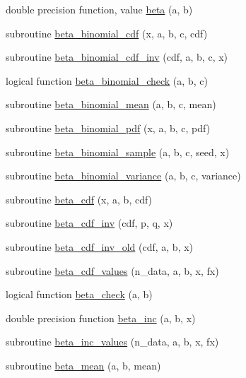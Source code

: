 \begin{DoxyCompactItemize}
double precision function, value \hyperlink{subroutines_8f_a4545c4482f31f1e6eddae40f6ed6bbfb}{beta} (a, b)
\item 
subroutine \hyperlink{subroutines_8f_ab79beb1b437d17ea84c53e4d40471f80}{beta\+\_\+binomial\+\_\+cdf} (x, a, b, c, cdf)
\item 
subroutine \hyperlink{subroutines_8f_ae6870b2fc15398bbb52dd3b2ed8c92fb}{beta\+\_\+binomial\+\_\+cdf\+\_\+inv} (cdf, a, b, c, x)
\item 
logical function \hyperlink{subroutines_8f_a35d163e54f3880b3b4a4fc1c46ec6690}{beta\+\_\+binomial\+\_\+check} (a, b, c)
\item 
subroutine \hyperlink{subroutines_8f_af4c24e7e5f9bebb7bde58f72d2d0bef1}{beta\+\_\+binomial\+\_\+mean} (a, b, c, mean)
\item 
subroutine \hyperlink{subroutines_8f_a0b1b4e2bbf9c50969318fac23e17215c}{beta\+\_\+binomial\+\_\+pdf} (x, a, b, c, pdf)
\item 
subroutine \hyperlink{subroutines_8f_ad097654db5e79584fe38d2a53c8ffad8}{beta\+\_\+binomial\+\_\+sample} (a, b, c, seed, x)
\item 
subroutine \hyperlink{subroutines_8f_af18db84101609c96170537b5e09fab18}{beta\+\_\+binomial\+\_\+variance} (a, b, c, variance)
\item 
subroutine \hyperlink{subroutines_8f_a1307bf242705ab2dc0a8db7fc66f4128}{beta\+\_\+cdf} (x, a, b, cdf)
\item 
subroutine \hyperlink{subroutines_8f_ad7b9df743251c691af6f3c722fc44a70}{beta\+\_\+cdf\+\_\+inv} (cdf, p, q, x)
\item 
subroutine \hyperlink{subroutines_8f_a809c02d9b3e29e164a314e6b82989080}{beta\+\_\+cdf\+\_\+inv\+\_\+old} (cdf, a, b, x)
\item 
subroutine \hyperlink{subroutines_8f_a6ca4d09928ee56be09ca34c70fbc37ce}{beta\+\_\+cdf\+\_\+values} (n\+\_\+data, a, b, x, fx)
\item 
logical function \hyperlink{subroutines_8f_a006a8a482ef44095ae5e65425badff73}{beta\+\_\+check} (a, b)
\item 
double precision function \hyperlink{subroutines_8f_a2184970d382ccfa52654d945934a5db9}{beta\+\_\+inc} (a, b, x)
\item 
subroutine \hyperlink{subroutines_8f_ad6f95398deb212fed550fff77fee8aa7}{beta\+\_\+inc\+\_\+values} (n\+\_\+data, a, b, x, fx)
\item 
subroutine \hyperlink{subroutines_8f_a27758be0991a382242cea8fd6d1c6062}{beta\+\_\+mean} (a, b, mean)
\item 

\end{DoxyCompactItemize}

